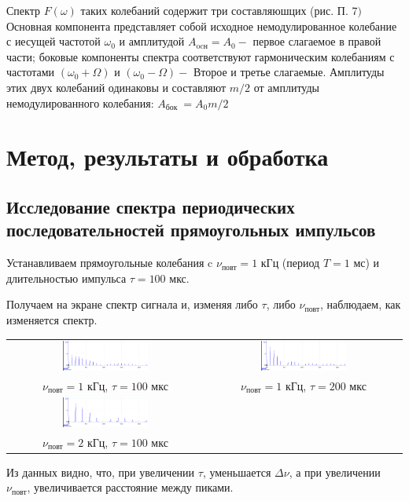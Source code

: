 \documentclass[a4paper, 12pt]{article}%
\begin{document}
Спектр $F(\omega)$ таких колебаний содержит три составляюшцих (рис. П. 7$)$ Основная компонента представляет собой исходное немодулированное колебание с иесущей частотой $\omega_{0}$ и амплитудой $A_{\mathrm{ocн}}=A_{0}-$ первое слагаемое в правой части; боковые компоненты спектра соответствуют гармоническим колебаниям с частотами $\left(\omega_{0}+\Omega\right)$ и $\left(\omega_{0}-\Omega\right)-$ Второе и третье слагаемые. Амплитуды этих двух колебаний одинаковы и составляют $m / 2$ от амплитуды немодулированного колебания: $A_{\text {бок }}=A_{0} m / 2$


\section{Метод, результаты и обработка}

\subsection{Исследование спектра периодических последовательностей прямоугольных импульсов}
Устанавливаем прямоугольные колебания c $\nu_{\text{повт}} = 1$ кГц (период $T = 1$ мс) и длительностью импульса $\tau = 100$ мкс.

Получаем на экране спектр сигнала и, изменяя либо $\tau$, либо $\nu_{\text{повт}}$, наблюдаем, как изменяется спектр.

\begin{center}
\begin{tabular}{cc}
\includegraphics[width=0.45\textwidth]{./res/6.png}&\includegraphics[width=0.45\textwidth]{./res/7a.png}\\

$\nu_{\text{повт}} = 1$ кГц, $\tau = 100$ мкс&$\nu_{\text{повт}} = 1$ кГц, $\tau = 200$ мкс\\

\includegraphics[width=0.45\textwidth]{./res/7b.png}\\

$\nu_{\text{повт}} = 2$ кГц, $\tau = 100$ мкс\\
\end{tabular}
\end{center}
Из данных видно, что, при увеличении $\tau$, уменьшается $\Delta \nu$, а при увеличении $\nu_\text{повт}$, увеличивается расстояние между пиками.
\end{document}

